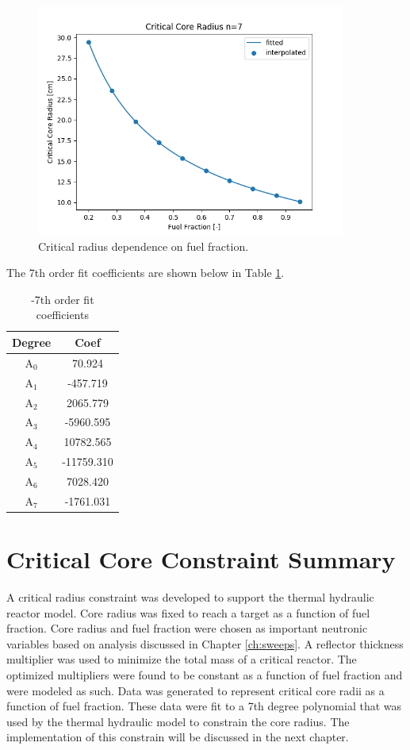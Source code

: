 \begin{figure}[h]
    \centering
    \includegraphics[width=4in]{../images/uo2_co2_core_r.png}
\caption{Critical radius dependence on fuel fraction.}
\label{fig:core_r_co2_uo2}
\end{figure}

The 7th order fit coefficients are shown below in Table
\ref{tab:uo2_co2_fit_coeffs}.

\begin{table}[h]
  \centering
  \caption{\uox-\codiox 7th order fit coefficients}
  \begin{tabular}{cc}
    \toprule
     Degree & Coef\\ 
    \midrule                                  
    A$_0$  &  70.924\\
    A$_1$  &  -457.719\\
    A$_2$  &  2065.779\\
    A$_3$  &  -5960.595\\
    A$_4$  &  10782.565\\
    A$_5$  &  -11759.310\\
    A$_6$  &  7028.420\\
    A$_7$  &  -1761.031\\
  \end{tabular}
  \label{tab:uo2_co2_fit_coeffs}
\end{table}

\section{Critical Core Constraint Summary}
A critical radius constraint was developed to support the thermal hydraulic
reactor model. Core radius was fixed to reach a target \keff as a function of
fuel fraction. Core radius and fuel fraction were chosen as important neutronic
variables based on analysis discussed in Chapter \ref{ch:sweeps}. A reflector
thickness multiplier was used to minimize the total mass of a critical reactor.
The optimized multipliers were found to be constant as a function of fuel
fraction and were modeled as such. Data was generated to represent critical core
radii as a function of fuel fraction. These data were fit to a 7th
degree polynomial that was used by the thermal hydraulic model to constrain the
core radius. The implementation of this constrain will be discussed in the next
chapter.
